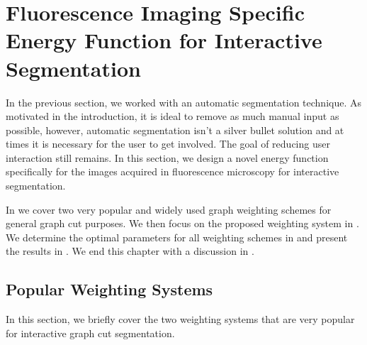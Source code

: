 
\chapter{Fluorescence Imaging Specific Energy Function for Interactive Segmentation} %

\label{chap:Chapter6} %


In the previous section, we worked with an automatic segmentation technique. As motivated in the introduction, it is ideal to remove as much manual input as possible, however, automatic segmentation isn't a silver bullet solution and at times it is necessary for the user to get involved. The goal of reducing user interaction still remains. In this section, we design a novel energy function specifically for the images acquired in fluorescence microscopy for interactive segmentation.

In  we cover two very popular and widely used graph weighting schemes for general graph cut purposes. We then focus on the proposed weighting system in . We determine the optimal parameters for all weighting schemes in  and present the results in . We end this chapter with a discussion in .


\section{Popular Weighting Systems}
\label{sec:interactivepopularweighting}

In this section, we briefly cover the two weighting systems that are very popular for interactive graph cut segmentation.

